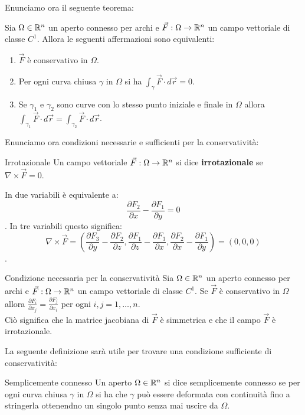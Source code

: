 Enunciamo ora il seguente teorema:
\begin{teorema}{}
  Sia $\Omega \in \mathbb{R}^n$ un aperto connesso per archi e $\vec F: \Omega \rightarrow \mathbb{R}^n$ un campo vettoriale di classe $C^1$. Allora le seguenti affermazioni sono equivalenti:
  \begin{enumerate}
    \item $\vec F$ è conservativo in $\Omega$.
    \item Per ogni curva chiusa $\gamma$ in $\Omega$ si ha $\int_\gamma \vec F \cdot d\vec r = 0$.
    \item Se $\gamma_1$ e $\gamma_2$ sono curve con lo stesso punto iniziale e finale in $\Omega$ allora $\int_{\gamma_1} \vec F \cdot d\vec r = \int_{\gamma_2} \vec F \cdot d\vec r$.
  \end{enumerate}
\end{teorema}

Enunciamo ora condizioni necessarie e sufficienti per la conservatività:


\begin{definizione}{Irrotazionale}
  Un campo vettoriale $\vec F: \Omega \rightarrow \mathbb{R}^n$ si dice \textbf{irrotazionale} se $\nabla \times \vec F = 0$. \\
\end{definizione}
In due variabili è equivalente a:
$$\frac{\partial F_2}{\partial x} - \frac{\partial F_1}{\partial y}=0$$.
In tre variabili questo significa:
$$\nabla \times \vec F = \left( \frac{\partial F_3}{\partial y} - \frac{\partial F_2}{\partial z}, \frac{\partial F_1}{\partial z} - \frac{\partial F_3}{\partial x}, \frac{\partial F_2}{\partial x} - \frac{\partial F_1}{\partial y} \right) = (0,0,0)$$.

\begin{teorema}{Condizione necessaria per la conservatività}
  Sia $\Omega \in \mathbb{R}^n$ un aperto connesso per archi e $\vec F: \Omega \rightarrow \mathbb{R}^n$ un campo vettoriale di classe $C^1$. Se $\vec F$ è conservativo in $\Omega$ allora $\frac{\partial F_i}{\partial x_j} = \frac{\partial F_j}{\partial x_i}$ per ogni $i,j = 1, \ldots, n$. \\
  Ciò significa che la matrice jacobiana di $\vec F$ è simmetrica e che il campo $\vec F$ è irrotazionale.
\end{teorema}

La seguente definizione sarà utile per trovare una condizione sufficiente di conservatività:

\begin{definizione}{Semplicemente connesso}
  Un aperto $\Omega \in \mathbb{R}^n$ si dice semplicemente connesso se per ogni curva chiusa $\gamma$ in $\Omega$ si ha che $\gamma$ può essere deformata con continuità fino a stringerla ottenendno un singolo punto senza mai uscire da $\Omega$.
\end{definizione}

